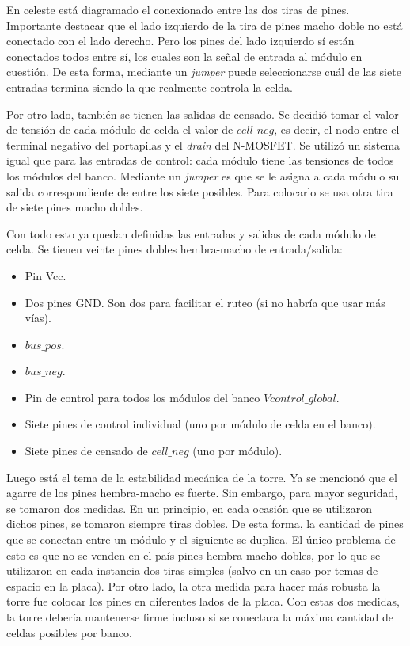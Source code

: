 En celeste está diagramado el conexionado entre las dos tiras de pines. Importante destacar que el lado izquierdo de la tira de pines macho doble no está conectado con el lado derecho. Pero los pines del lado izquierdo sí están conectados todos entre sí, los cuales son la señal de entrada al módulo en cuestión. De esta forma, mediante un \textit{jumper} puede seleccionarse cuál de las siete entradas termina siendo la que realmente controla la celda.

Por otro lado, también se tienen las salidas de censado. Se decidió tomar el valor de tensión de cada módulo de celda el valor de $cell\_neg$, es decir, el nodo entre el terminal negativo del portapilas y el \textit{drain} del N-MOSFET. Se utilizó un sistema igual que para las entradas de control: cada módulo tiene las tensiones de todos los módulos del banco. Mediante un \textit{jumper} es que se le asigna a cada módulo su salida correspondiente de entre los siete posibles. Para colocarlo se usa otra tira de siete pines macho dobles.

Con todo esto ya quedan definidas las entradas y salidas de cada módulo de celda. Se tienen veinte pines dobles hembra-macho de entrada/salida:
\begin{itemize}
    \item Pin Vcc.
    \item Dos pines GND. Son dos para facilitar el ruteo (si no habría que usar más vías).
    \item $bus\_pos$.
    \item $bus\_neg$.
    \item Pin de control para todos los módulos del banco $Vcontrol\_global$.
    \item Siete pines de control individual (uno por módulo de celda en el banco).
    \item Siete pines de censado de $cell\_neg$ (uno por módulo).
\end{itemize}

Luego está el tema de la estabilidad mecánica de la torre. Ya se mencionó que el agarre de los pines hembra-macho es fuerte. Sin embargo, para mayor seguridad, se tomaron dos medidas. En un principio, en cada ocasión que se utilizaron dichos pines, se tomaron siempre tiras dobles. De esta forma, la cantidad de pines que se conectan entre un módulo y el siguiente se duplica. El único problema de esto es que no se venden en el país pines hembra-macho dobles, por lo que se utilizaron en cada instancia dos tiras simples (salvo en un caso por temas de espacio en la placa). Por otro lado, la otra medida para hacer más robusta la torre fue colocar los pines en diferentes lados de la placa. Con estas dos medidas, la torre debería mantenerse firme incluso si se conectara la máxima cantidad de celdas posibles por banco.

